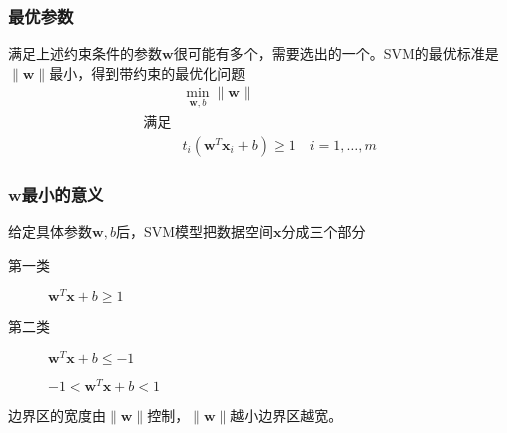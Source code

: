 \documentclass[14pt]{beamer}
\renewcommand{\vec}[1]{\bm{#1}}
\newcommand{\Vx}{\vec{x}}
\newcommand{\Vw}{\vec{w}}
\let\emph\relax %
\begin{document}
\begin{frame}
  \frametitle{最优参数}
  满足上述约束条件的参数$\Vw$很可能有多个，需要选出\emph{最优}的一个。SVM的最优标准是$\|\Vw\|$最小，得到带约束的最优化问题
  \begin{equation}
    \begin{aligned}
    &\min_{\Vw,b} \|\Vw\|\\
    \text{满足}&\\
    &t_i(\Vw^T\Vx_i+b)\ge1\quad\text{$i=1,\ldots,m$}
  \end{aligned}
\end{equation}
\end{frame}

\begin{frame}
  \frametitle{$\Vw$最小的意义}
  给定具体参数$\Vw,b$后，SVM模型把数据空间$\Vx$分成三个部分
  \begin{description}
    \item[第一类] $\Vw^T\Vx+b\ge1$ 
    \item[第二类] $\Vw^T\Vx+b\le-1$ 
    \item[\emph{边界区}] $-1<\Vw^T\Vx+b<1$ 
  \end{description}

  边界区的宽度由$\|\Vw\|$控制，$\|\Vw\|$越小边界区越宽。
\end{frame}
\end{document}
